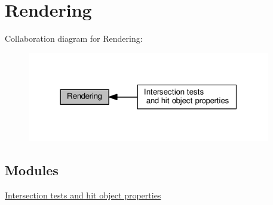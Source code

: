 \hypertarget{group__rendering}{}\section{Rendering}
\label{group__rendering}
Collaboration diagram for Rendering\+:\nopagebreak
\begin{figure}[H]
\begin{center}
\leavevmode
\includegraphics[width=301pt]{group__rendering}
\end{center}
\end{figure}
\subsection*{Modules}
\begin{DoxyCompactItemize}
\item 
\hyperlink{group__intersection__test__prperties}{Intersection tests and hit object properties}
\end{DoxyCompactItemize}
